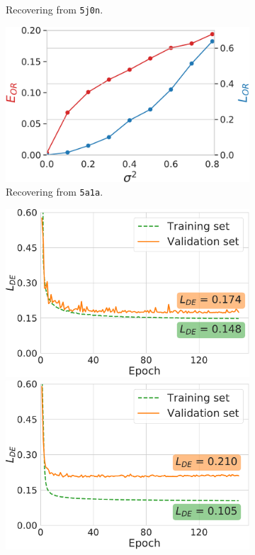 \begin{figure}
\begin{minipage}[b]{0.48\linewidth}
\begin{subfigure}[b]{0.49\linewidth}
            \caption{Recovering from \texttt{5j0n}.}
        \end{subfigure}
        \hfill
        \begin{subfigure}[b]{0.49\linewidth}
        \centering
            \includegraphics[width=\linewidth]{figures/5a1a_perfect_noisy_ar_aa}
            \caption{Recovering from \texttt{5a1a}.}
        \end{subfigure}
        \caption{%
            Orientation recovery from perturbed distances.
        }\label{fig:perfect-with-noise-ar-aa}
    \end{minipage}
    \hfill
    \begin{minipage}[b]{0.45\linewidth}
        \begin{subfigure}[b]{\linewidth}
            \centering
            \includegraphics[width=0.47\linewidth]{figures/de_5j0n.pdf}
            \hfill
            \includegraphics[width=0.47\linewidth]{figures/de_5a1a.pdf}

\end{subfigure}
\end{minipage}
\end{figure}
